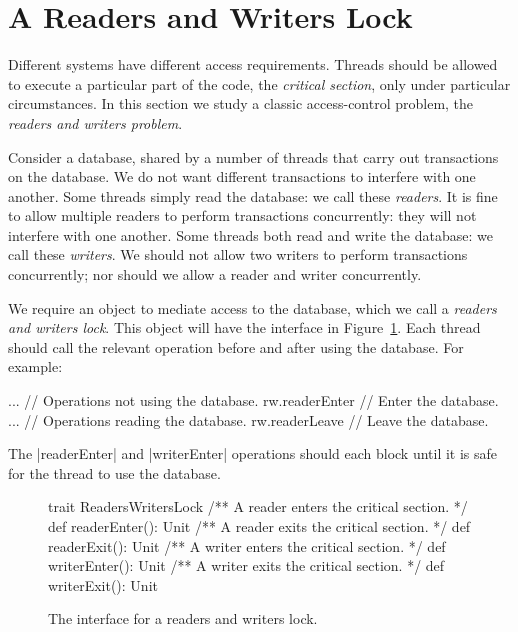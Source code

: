 \section{A Readers and Writers Lock}
\label{sec:conditionsReadersWriters}

Different systems have different access requirements.  Threads should be
allowed to execute a particular part of the code, the \emph{critical
  section}, only under particular circumstances.  In
this section we study a classic access-control problem, the \emph{readers and
  writers problem}.

Consider a database, shared by a number of threads that carry out transactions
on the database.  We do not want different transactions to interfere with one
another.  Some threads simply read the database: we call these \emph{readers}.
It is fine to allow multiple readers to perform transactions concurrently:
they will not interfere with one another.  Some threads both read and write
the database: we call these \emph{writers}.  We should not allow two writers
to perform transactions concurrently; nor should we allow a reader and writer
concurrently.

We require an object to mediate access to the database, which we call a
\emph{readers and writers lock}.  This object
will have the interface in Figure~\ref{fig:readers-writers}.  Each thread
should call the relevant operation before and after using the database.  For
example:
\begin{scala}
  ... // Operations not using the database.
  rw.readerEnter // Enter the database.
  ... // Operations reading the database.
  rw.readerLeave // Leave the database.
\end{scala}
%
The |readerEnter| and |writerEnter| operations should each block until it is
safe for the thread to use the database.


\begin{figure}
\begin{scala}
trait ReadersWritersLock{
  /** A reader enters the critical section. */
  def readerEnter(): Unit
  /** A reader exits the critical section. */
  def readerExit(): Unit
  /** A writer enters the critical section. */
  def writerEnter(): Unit
  /** A writer exits the critical section. */
  def writerExit(): Unit
}
\end{scala}
\caption{The interface for a readers and writers lock.}
\label{fig:readers-writers}
\end{figure}

